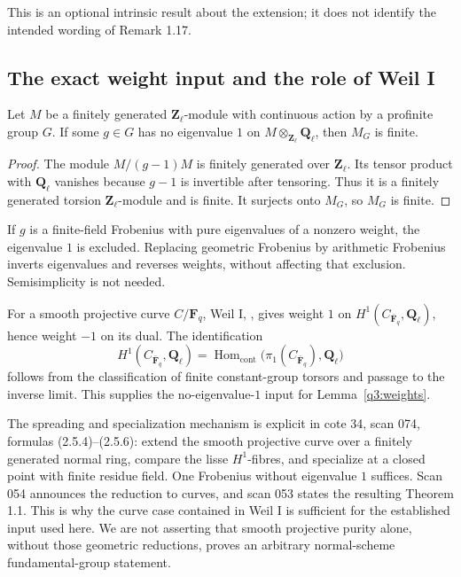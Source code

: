 This is an optional intrinsic result about the extension; it does
not identify the intended wording of Remark 1.17.

\subsection{The exact weight input and the role of Weil I}

\begin{lemma}
\label{q3:weights}
Let \(M\) be a finitely generated \(\mathbf Z_\ell\)-module with
continuous action by a profinite group \(G\).  If some \(g\in G\)
has no eigenvalue \(1\) on \(M\otimes_{\mathbf Z_\ell}\mathbf Q_\ell\),
then \(M_G\) is finite.
\end{lemma}

\begin{proof}
The module \(M/(g-1)M\) is finitely generated over
\(\mathbf Z_\ell\).  Its tensor product with \(\mathbf Q_\ell\)
vanishes because \(g-1\) is invertible after tensoring.  Thus it is
a finitely generated torsion \(\mathbf Z_\ell\)-module and is
finite.  It surjects onto \(M_G\), so \(M_G\) is finite.
\end{proof}

If \(g\) is a finite-field Frobenius with pure eigenvalues of a
nonzero weight, the eigenvalue \(1\) is excluded.  Replacing
geometric Frobenius by arithmetic Frobenius inverts eigenvalues
and reverses weights, without affecting that exclusion.
Semisimplicity is not needed.

For a smooth projective curve \(C/\mathbf F_q\), Weil I,
\cite[(1.6)--(1.7)]{WeilI}, gives weight \(1\) on
\(H^1(C_{\overline{\mathbf F}_q},\mathbf Q_\ell)\), hence weight
\(-1\) on its dual.  The identification
\[
H^1(C_{\overline{\mathbf F}_q},\mathbf Q_\ell)
=\operatorname{Hom}_{\mathrm{cont}}
 \bigl(\pi_1(C_{\overline{\mathbf F}_q}),\mathbf Q_\ell\bigr)
\]
follows from the classification of finite constant-group torsors
and passage to the inverse limit.  This supplies the
no-eigenvalue-\(1\) input for Lemma~\ref{q3:weights}.

The spreading and specialization mechanism is explicit in cote
34, scan 074, formulas (2.5.4)--(2.5.6): extend the smooth
projective curve over a finitely generated normal ring, compare
the lisse \(H^1\)-fibres, and specialize at a closed point with
finite residue field.  One Frobenius without eigenvalue \(1\)
suffices.  Scan 054 announces the reduction to curves, and scan
053 states the resulting Theorem 1.1.  This is why the curve
case contained in Weil I is sufficient for the established input
used here.  We are not asserting that smooth projective purity
alone, without those geometric reductions, proves an arbitrary
normal-scheme fundamental-group statement.

